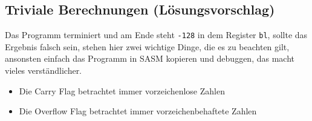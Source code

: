 \documentclass{article}
\begin{document}
\subsection{Triviale Berechnungen (Lösungsvorschlag)}
\label{sec:lsg03}
Das Programm terminiert und am Ende steht \texttt{-128} in dem Register \texttt{bl}, sollte das Ergebnis falsch sein, stehen hier zwei wichtige Dinge, die es zu beachten gilt, ansonsten einfach das Programm in SASM kopieren und debuggen, das macht vieles verständlicher.

\begin{itemize}
    \item Die Carry Flag betrachtet immer vorzeichenlose Zahlen
    \item Die Overflow Flag betrachtet immer vorzeichenbehaftete Zahlen
\end{itemize}
\end{document}
